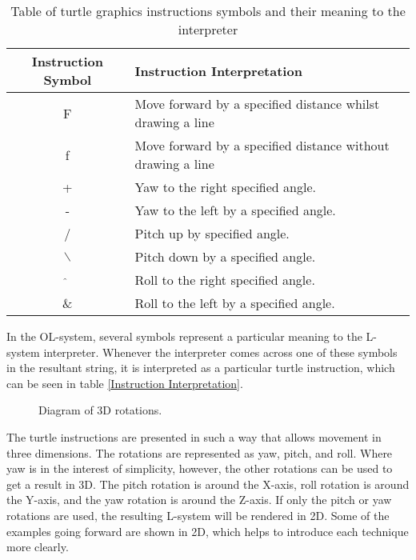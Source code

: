 \begin{table}[h!]
\centering
\begin{tabular}{ | c | l | }
\hline
	Instruction Symbol 	& Instruction Interpretation \\  
\hline
\hline
	F 					& Move forward by a specified distance whilst drawing a line\\
\hline
	f 					& Move forward by a specified distance without drawing a line\\
\hline
	+ 					& Yaw to the right specified angle.\\
\hline
	- 					& Yaw to the left by a specified angle.\\
\hline
	/ 					& Pitch up by specified angle. \\
\hline
	$\backslash$ 		& Pitch down by a specified angle.\\
\hline
	$\hat{}$ 			& Roll to the right specified angle.\\
\hline
	\& 					& Roll to the left by a specified angle.\\
\hline
\end{tabular}
\caption{Table of turtle graphics instructions symbols and their meaning to the interpreter}
\label{DOL-system instructions}
\end{table}
\FloatBarrier

\noindent
In the OL-system, several symbols represent a particular meaning to the L-system interpreter. Whenever the interpreter comes across one of these symbols in the resultant string, it is interpreted as a particular turtle instruction, which can be seen in table \ref{Instruction Interpretation}.

\begin{figure}[htbp]
	{\centering
		\setlength{\fboxrule}{1pt}
		\vspace{7px}
		\caption{Diagram of 3D rotations.} \label{3D turtle rotations}
	}
\end{figure}
\FloatBarrier

\noindent
The turtle instructions are presented in such a way that allows movement in three dimensions. The rotations are represented as yaw, pitch, and roll. Where yaw is in the interest of simplicity, however, the other rotations can be used to get a result in 3D. The pitch rotation is around the X-axis, roll rotation is around the Y-axis, and the yaw rotation is around the Z-axis. If only the pitch or yaw rotations are used, the resulting L-system will be rendered in 2D. Some of the examples going forward are shown in 2D, which helps to introduce each technique more clearly. 


